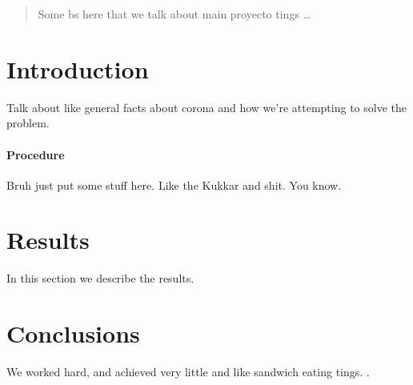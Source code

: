 \documentclass[12pt]{article}
\begin{document}
\maketitle

\begin{abstract}
Some bs here that we talk about main proyecto tings \ldots
\end{abstract}

\section{Introduction}
Talk about like general facts about corona and how we're attempting to solve the problem.

\paragraph{Procedure}
Bruh just put some stuff here. Like the Kukkar and shit. You know.

\section{Results}\label{results}
In this section we describe the results.

\section{Conclusions}\label{conclusions}
We worked hard, and achieved very little and like sandwich eating tings. .



\end{document}
